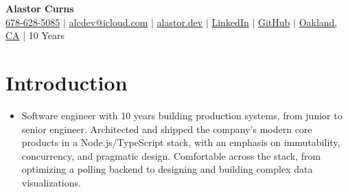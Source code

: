 \documentclass[letterpaper,11pt]{article}
\newcommand{\resumeSubHeadingListStart}{\begin{itemize}[leftmargin=0.08in, label={}]}
\newcommand{\resumeSubHeadingListEnd}{\end{itemize}}
\begin{document}
\begin{center}
  \textbf{\Huge Alastor Curns} \\ \vspace{2pt}
  \faMobile \hspace{.5pt} \href{tel:16786285085}{678-628-5085}
  $|$
  \faPaperPlane \hspace{.5pt} \href{mailto:alcdev@icloud.com}{alcdev@icloud.com}
  $|$
  \faSitemap \hspace{.5pt} \href{https://alastor.dev}{alastor.dev}
  $|$
  \faLinkedinSquare \hspace{.5pt} \href{https://www.linkedin.com/in/alastorc}{LinkedIn}
  $|$
  \faGithub \hspace{.5pt} \href{https://github.com/alastor-lee}{GitHub}
  $|$
  \faGlobe \hspace{.5pt} \href{https://maps.app.goo.gl/CdQMUuxD24zfLjYq7}{Oakland, CA}
  $|$
  \faHistory \hspace{.5pt} 10 Years
\end{center}

\section{Introduction}
\resumeSubHeadingListStart
\item{
            Software engineer with 10 years building production systems, from junior to senior engineer.
            Architected and shipped the company's modern core products in a Node.js/TypeScript stack, 
            with an emphasis on immutability, concurrency, and pragmatic design.
            Comfortable across the stack, 
            from optimizing a polling backend to designing and building complex data visualizations.
      }
\resumeSubHeadingListEnd
\end{document}
